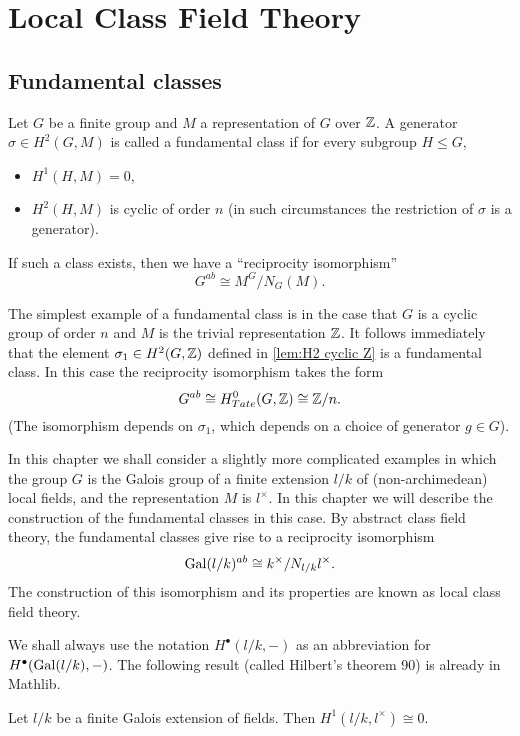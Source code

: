 \chapter{Local Class Field Theory}

\section{Fundamental classes}
Let $G$ be a finite group and $M$ a representation of $G$ over ${\mathbb Z}$.
A generator $\sigma \in H^2(G,M)$ is called a fundamental class if for every subgroup $H \le G$,
\begin{itemize}
	\item
	$H^1(H,M) = 0$,
	\item
	$H^2(H,M)$ is cyclic of order $n$
	(in such circumstances the restriction of $\sigma$ is a generator).
\end{itemize}
If such a class exists, then we have a ``reciprocity isomorphism''
\[
	G^{ab} \cong M^G / N_G(M).
\]

The simplest example of a fundamental class is in the case
that $G$ is a cyclic group of order $n$ and $M$ is the trivial representation ${\mathbb Z}$.
It follows immediately that the element $\sigma_1 \in H^2(G,{\mathbb Z})$ defined in
\ref{lem:H2 cyclic Z} is a fundamental class.
In this case the reciprocity isomorphism takes the form
\[
	G^{ab} \cong H^0_{Tate} (G,{\mathbb Z}) \cong {\mathbb Z}/n.
\]
(The isomorphism depends on $\sigma_1$, which depends on a choice of generator $g \in G$).

In this chapter we shall consider a slightly more complicated examples in which the group $G$ is
the Galois group of a finite extension $l/k$ of (non-archimedean) local fields, and the
representation $M$ is $l^\times$.
In this chapter we will describe the construction of the fundamental classes in this case.
By abstract class field theory, the fundamental classes give rise to a reciprocity isomorphism
\[
	\mathrm{Gal}(l/k)^{ab} \cong k^\times / N_{l/k} l^\times.
\]
The construction of this isomorphism and its properties are known as local class field theory.

We shall always use the notation $H^\bullet(l/k,-)$ as an abbreviation
for $H^\bullet(\mathrm{Gal}(l/k),-)$.
The following result (called Hilbert's theorem 90) is already in Mathlib.

\begin{theorem}\label{thm:hilbert 90}
	\mathlibok
	Let $l/k$ be a finite Galois extension of fields.
	Then $H^1(l/k, l^\times) \cong 0$.
\end{theorem}

